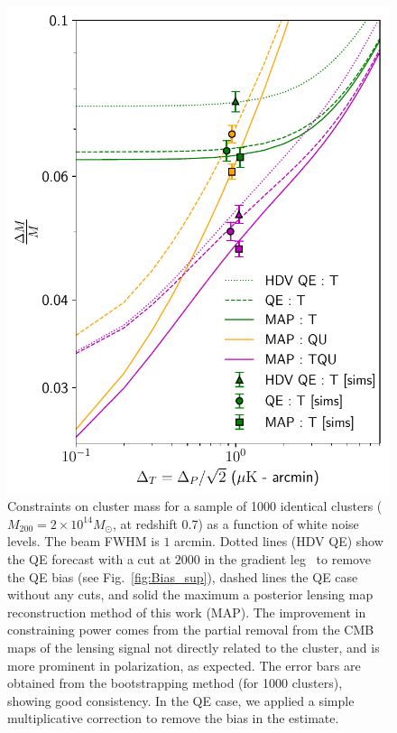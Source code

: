 \documentclass[prd, superscriptaddress, tightenlines, longbibliography, nofootinbib, eqsecnum, amsfonts, amsmath, floatfix, twocolumn, notitlepage]{revtex4-2}
\begin{document}
\begin{figure}
	\centering
	\hspace{-1.2cm}
	\includegraphics[width=1.\hsize]{Figures/forcast_snr.pdf}
	\caption{Constraints on cluster mass for a sample of 1000 identical clusters ($M_{200} = 2\times10^{14}M_{\odot}$, at redshift 0.7) as a function of white noise levels. The beam FWHM is $1$ arcmin. Dotted lines (HDV QE) show the QE forecast with a cut at $2000$ in the gradient leg~\cite{Hu:2007bt} to remove the QE bias (see Fig.~\ref{fig:Bias_sup}), dashed lines the QE case without any cuts, and solid the maximum a posterior lensing map reconstruction method of this work (MAP). The improvement in constraining power comes from the partial removal from the CMB maps of the lensing signal not directly related to the cluster, and is more prominent in polarization, as expected. The error bars are obtained from the bootstrapping method (for 1000 clusters), showing good consistency. In the QE case, we applied a simple multiplicative correction to remove the bias in the estimate.}
	\label{fig:forecast}
\end{figure}
\end{document}
